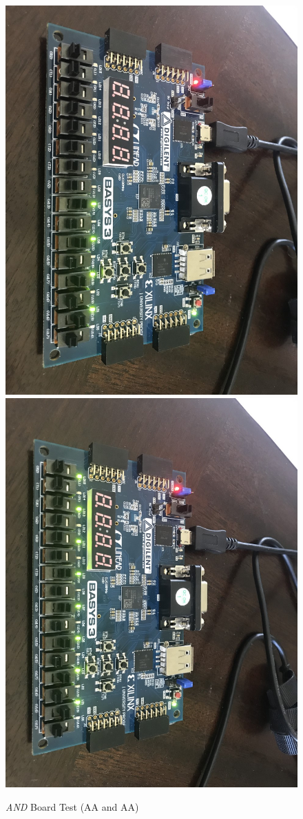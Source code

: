 \documentclass[11pt]{article}
\begin{document}
\begin{figure}[ht]\centering
	\includegraphics[angle=90, width=.8\textwidth]{and1}
	\includegraphics[angle=90, width=.8\textwidth]{and2}
	\caption{\textit{AND} Board Test (AA and AA)}
	\label{fig:sim_with_table}
\end{figure}
\end{document}
